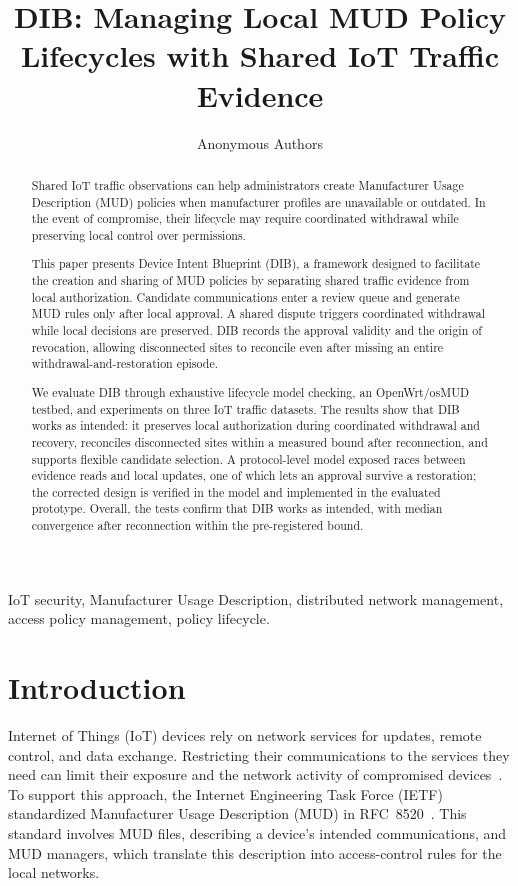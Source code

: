 \documentclass[journal]{IEEEtran}
\theoremstyle{definition}
\begin{document}
\title{DIB: Managing Local MUD Policy Lifecycles with Shared IoT Traffic Evidence}
\author{Anonymous Authors}
\maketitle

\begin{abstract}
Shared IoT traffic observations can help administrators create Manufacturer Usage Description (MUD) policies when manufacturer profiles are unavailable or outdated.
In the event of compromise, their lifecycle may require coordinated withdrawal while preserving local control over permissions.

This paper presents Device Intent Blueprint (DIB), a framework designed to facilitate the creation and sharing of MUD policies by separating shared traffic evidence from local authorization. Candidate communications enter a review queue and generate MUD rules only after local approval.  A shared dispute triggers coordinated withdrawal while local decisions are preserved. DIB records the approval validity and the origin of revocation, allowing disconnected sites to reconcile even after missing an entire withdrawal-and-restoration episode.

 We evaluate DIB through exhaustive lifecycle model checking, an OpenWrt/osMUD testbed, and experiments on three IoT traffic datasets. The results show that DIB works as intended: it preserves local authorization during coordinated withdrawal and recovery, reconciles disconnected sites within a measured bound after reconnection, and supports flexible candidate selection. A protocol-level model exposed races between evidence reads and local updates, one of which lets an approval survive a restoration; the corrected design is verified in the model and implemented in the evaluated prototype. Overall, the tests confirm that DIB works as intended, with median convergence after reconnection within the pre-registered bound.
\end{abstract}

\begin{IEEEkeywords}
IoT security, Manufacturer Usage Description, distributed network management, access policy management, policy lifecycle.
\end{IEEEkeywords}

\section{Introduction}
\label{sec:introduction}
Internet of Things (IoT) devices rely on network services for updates, remote control, and data exchange. Restricting their communications to the services they need can limit their exposure and the network activity of compromised devices~\cite{mirai,hernandezramos2021mudreview}. To support this approach, the Internet Engineering Task Force (IETF) standardized Manufacturer Usage Description (MUD) in RFC~8520~\cite{rfc8520}. This standard involves MUD files, describing a device's intended communications, and MUD managers, which translate this description into access-control rules for the local networks.
\end{document}
